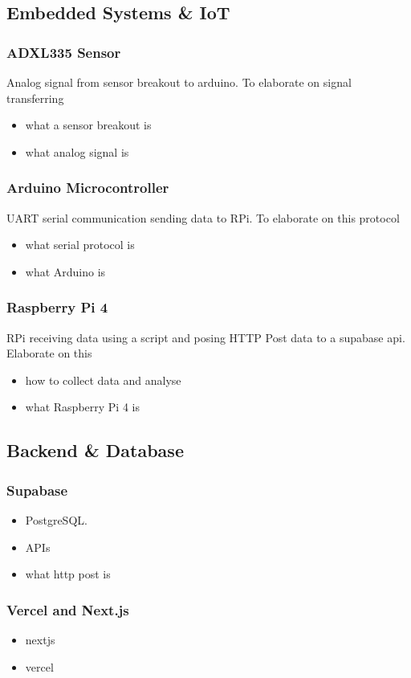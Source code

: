 \subsection{Embedded Systems \& IoT}
\subsubsection{ADXL335 Sensor}
Analog signal from sensor breakout to arduino. To elaborate on signal transferring
\begin{itemize}
\item what a sensor breakout is
\item what analog signal is
\end{itemize}


\subsubsection{Arduino Microcontroller}
UART serial communication sending data to RPi. To elaborate on this protocol
\begin{itemize}
\item what serial protocol is
\item what Arduino is
\end{itemize}

\subsubsection{Raspberry Pi 4}
RPi receiving data using a script and posing HTTP Post data to a supabase api. Elaborate on this

\begin{itemize}
\item how to collect data and analyse
\item what Raspberry Pi 4 is
\end{itemize}




\subsection{Backend \& Database}
\subsubsection{Supabase}
\begin{itemize}  
	\item PostgreSQL. 
	\item APIs
	\item what http post is
\end{itemize}  

\subsubsection{Vercel and Next.js}
\begin{itemize}  
	\item nextjs 
	\item vercel
\end{itemize} 